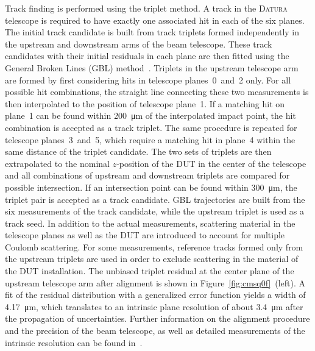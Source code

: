 \documentclass[a4paper,11pt]{article}
\newcommand{\datura}{\textsc{Datura}\xspace}
\begin{document}
Track finding is performed using the triplet method.
A track in the \datura telescope is required to have exactly one associated hit in each of the six planes.
The initial track candidate is built from track triplets formed independently in the upstream and downstream arms of the beam telescope.
These track candidates with their initial residuals in each plane are then fitted using the General Broken Lines (GBL) method~\cite{Blobel2006,Kleinwort2012107}.
Triplets in the upstream telescope arm are formed by first considering hits in telescope planes~0~and~2 only.
For all possible hit combinations, the straight line connecting these two measurements is then interpolated to the position of telescope plane~1.
If a matching hit on plane~1 can be found within \SI{200}{\micro\meter} of the interpolated impact point, the hit combination is accepted as a track triplet.
The same procedure is repeated for telescope planes~3~and~5, which require a matching hit in plane~4 within the same distance of the triplet candidate.
The two sets of triplets are then extrapolated to the nominal $z$-position of the DUT in the center of the telescope and all combinations of upstream and downstream triplets are compared for possible intersection.
If an intersection point can be found within \SI{300}{\micro\meter}, the triplet pair is accepted as a track candidate.
GBL trajectories are built from the six measurements of the track candidate, while the upstream triplet is used as a track seed.
In addition to the actual measurements, scattering material in the telescope planes as well as the DUT are introduced to account for multiple Coulomb scattering.
For some measurements, reference tracks formed only from the upstream triplets are used in order to exclude scattering in the material of the DUT installation.
The unbiased triplet residual at the center plane of the upstream telescope arm after alignment is shown in Figure~\ref{fig:cmsq0f}~(left).
A fit of the residual distribution with a generalized error function yields a width of \SI{4.17}{\um}, which translates to an intrinsic plane resolution of about \SI{3.4}{\um} after the propagation of uncertainties.
Further information on the alignment procedure and the precision of the beam telescope, as well as detailed measurements of the intrinsic resolution can be found in~\cite{datura-paper}.
\end{document}
